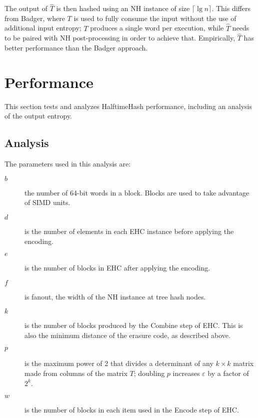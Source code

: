 \documentclass{llncs}
\begin{document}
The output of $\widehat{T}$ is then hashed using an NH instance of size $\lceil \lg n \rceil$.
This differs from Badger, where $T$ is used to fully consume the input without the use of additional input entropy;
$T$ produces a single word per execution, while $\widehat{T}$ needs to be paired with NH post-processing in order to achieve that.\cite{badger}
Empirically, $\widehat{T}$ has better performance than the Badger approach.

\section{Performance}
\label{performance}

This section tests and analyzes HalftimeHash performance, including an analysis of the output entropy.

\subsection{Analysis}
The parameters used in this analysis are:

\begin {description}
\item[$b$] the number of 64-bit words in a block.
  Blocks are used to take advantage of SIMD units.
\item[$d$] is the number of elements in each EHC instance before applying the encoding.
\item[$e$] is the number of blocks in EHC after applying the encoding.
\item[$f$] is fanout, the width of the NH instance at tree hash nodes.
\item[$k$] is the number of blocks produced by the Combine step of EHC.
  This is also the minimum distance of the erasure code, as described above.
\item[$p$] is the maximum power of 2 that divides a determinant of any $k \times k$ matrix made from columns of the matrix $T$; doubling $p$ increases $\varepsilon$ by a factor of $2^k$.
\item[$w$] is the number of blocks in each item used in the Encode step of EHC.
\end{description}
\end{document}
